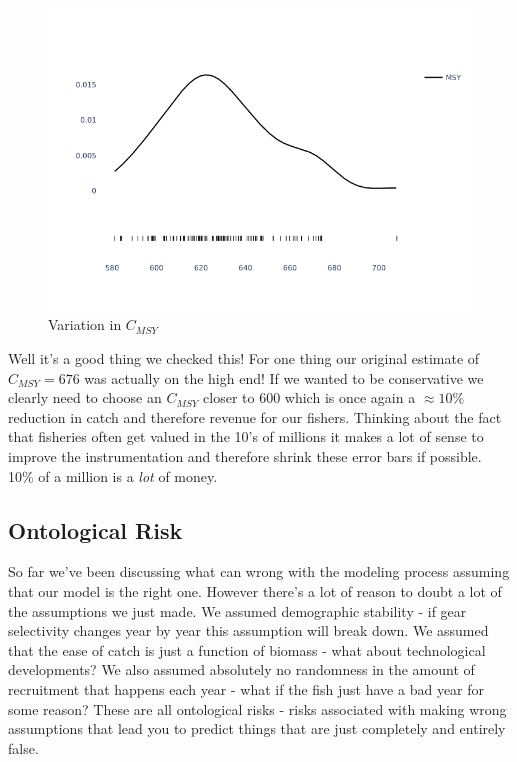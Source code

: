 \documentclass[11pt,a5paper]{book}
\begin{document}
\begin{figure}[h!] 
  \includegraphics[width=\linewidth]{notebooks/SurplusModels/instrumentation.png}
  \caption{Variation in $C_{MSY}$}
  \label{fig:instrumentation_error}
\end{figure}

Well it's a good thing we checked this! For one thing our original estimate of $C_{MSY}=676$ was actually on the high end! If we wanted to be conservative we clearly need to choose an $C_{MSY}$ closer to 600 which is once again a $\approx 10\%$ reduction in catch and therefore revenue for our fishers. Thinking about the fact that fisheries often get valued in the 10's of millions it makes a lot of sense to improve the instrumentation and therefore shrink these error bars if possible. 10\% of a million is a \textit{lot} of money. 
\newline

\subsection{Ontological Risk}

So far we've been discussing what can wrong with the modeling process assuming that our model is the right one. However there's a lot of reason to doubt a lot of the assumptions we just made. We assumed demographic stability - if gear selectivity changes year by year this assumption will break down. We assumed that the ease of catch is just a function of biomass - what about technological developments? We also assumed absolutely no randomness in the amount of recruitment that happens each year - what if the fish just have a bad year for some reason? These are all ontological risks - risks associated with making wrong assumptions that lead you to predict things that are just completely and entirely false. 
\newline
\end{document}
